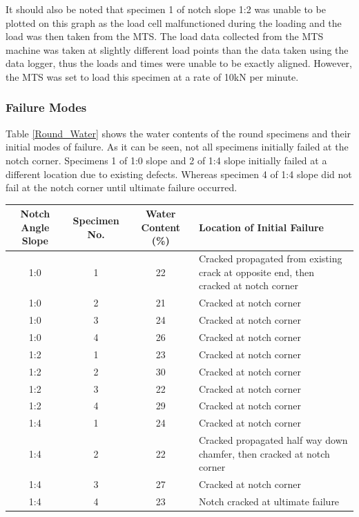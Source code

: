\documentclass[11pt,a4paper]{article}
\numberwithin{equation}{subsection}
\begin{document}
\vspace*{\baselineskip}

\noindent
It should also be noted that specimen 1 of notch slope 1:2 was unable to be plotted on this graph as the load cell malfunctioned during the loading and the load was then taken from the MTS. The load data collected from the MTS machine was taken at slightly different load points than the data taken using the data logger, thus the loads and times were unable to be exactly aligned. However, the MTS was set to load this specimen at a rate of 10kN per minute.  

\subsubsection{Failure Modes}
Table \ref{Round_Water} shows the water contents of the round specimens and their initial modes of failure. As it can be seen, not all specimens initially failed at the notch corner. Specimens 1 of 1:0 slope and 2 of 1:4 slope initially failed at a different location due to existing defects. Whereas specimen 4 of 1:4 slope did not fail at the notch corner until ultimate failure occurred. 

\vspace*{\baselineskip}


	\begin{tabular}{|c|c|c|p{4.5cm}|} 
		\hline
		\textbf{Notch Angle Slope} & \textbf{Specimen No.} & \textbf{Water Content (\%)} & \textbf{Location of Initial Failure}\\ [0.5ex]
		\hline
		
		1:0 & 1 & 22 & Cracked propagated from existing crack at opposite end, then cracked at notch corner  \\ [0.5ex]
		\hline
		1:0 & 2 & 21 & Cracked at notch corner  \\ [0.5ex]
		\hline
		1:0 & 3 & 24 & Cracked at notch corner  \\ [0.5ex]
		\hline
		1:0 & 4 & 26 & Cracked at notch corner \\ [0.5ex]
		\hline
		
		1:2 & 1 & 23 & Cracked at notch corner \\ [0.5ex]
		\hline
		1:2 & 2 & 30 & Cracked at notch corner \\ [0.5ex]
		\hline
		1:2 & 3 & 22 & Cracked at notch corner \\ [0.5ex]
		\hline
		1:2 & 4 & 29 & Cracked at notch corner \\ [0.5ex]
		\hline
		
		1:4 & 1 & 24 & Cracked at notch corner \\ [0.5ex]
		\hline
		1:4 & 2 & 22 & Cracked propagated half way down chamfer, then cracked at notch corner \\ [0.5ex]
		\hline
		1:4 & 3 & 27 & Cracked at notch corner \\ [0.5ex]
		\hline
		1:4 & 4 & 23 & Notch cracked at ultimate failure \\ [0.5ex]
		\hline
		
	\end{tabular}
	\label{Round_Water}
\end{document}
